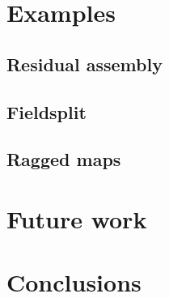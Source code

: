 \documentclass[thesis]{subfiles}
\begin{document}
  \section{Examples}

  \subsection{Residual assembly}

  \subsection{Fieldsplit}

  \subsection{Ragged maps}



  \section{Future work}


  \section{Conclusions}
\end{document}

